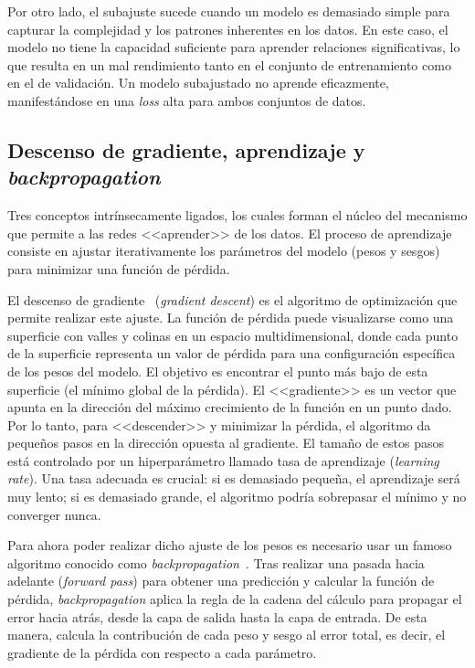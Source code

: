 Por otro lado, el subajuste sucede cuando un modelo es demasiado simple para capturar la complejidad y los patrones inherentes en los datos. En este caso, el modelo no tiene la capacidad suficiente para aprender relaciones significativas, lo que resulta en un mal rendimiento tanto en el conjunto de entrenamiento como en el de validación. Un modelo subajustado no aprende eficazmente, manifestándose en una \textit{loss} alta para ambos conjuntos de datos.

\subsection{Descenso de gradiente, aprendizaje y \textit{backpropagation}}

Tres conceptos intrínsecamente ligados, los cuales forman el núcleo del mecanismo que permite a las redes <<aprender>> de los datos. El proceso de aprendizaje consiste en ajustar iterativamente los parámetros del modelo (pesos y sesgos) para minimizar una función de pérdida.

El descenso de gradiente~\cite{amari2006theory} (\textit{gradient descent}) es el algoritmo de optimización que permite realizar este ajuste. La función de pérdida puede visualizarse como una superficie con valles y colinas en un espacio multidimensional, donde cada punto de la superficie representa un valor de pérdida para una configuración específica de los pesos del modelo. El objetivo es encontrar el punto más bajo de esta superficie (el mínimo global de la pérdida). El <<gradiente>> es un vector que apunta en la dirección del máximo crecimiento de la función en un punto dado. Por lo tanto, para <<descender>> y minimizar la pérdida, el algoritmo da pequeños pasos en la dirección opuesta al gradiente. El tamaño de estos pasos está controlado por un hiperparámetro llamado tasa de aprendizaje (\textit{learning rate}). Una tasa adecuada es crucial: si es demasiado pequeña, el aprendizaje será muy lento; si es demasiado grande, el algoritmo podría sobrepasar el mínimo y no converger nunca.

Para ahora poder realizar dicho ajuste de los pesos es necesario usar un famoso algoritmo conocido como \textit{backpropagation}~\cite{rumelhart1986learning}. Tras realizar una pasada hacia adelante (\textit{forward pass}) para obtener una predicción y calcular la función de pérdida, \textit{backpropagation} aplica la regla de la cadena del cálculo para propagar el error hacia atrás, desde la capa de salida hasta la capa de entrada. De esta manera, calcula la contribución de cada peso y sesgo al error total, es decir, el gradiente de la pérdida con respecto a cada parámetro.

